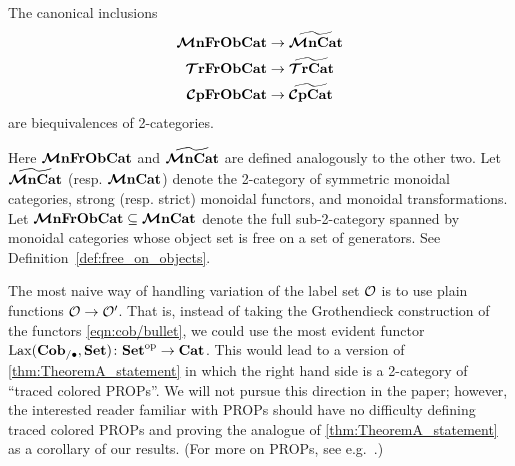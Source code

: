\documentclass[11pt,oneside,article]{memoir}
\begin{document}
\begin{corollary*}[\ref{cor:object_frees}]
   The canonical inclusions
   \begin{align*}
      \bm{\mathcal{M}}\mathbf{nFrObCat} &\to \widetilde{\bm{\mathcal{M}}\mathbf{nCat}} \\
      \bm{\mathcal{T}}\mathbf{rFrObCat} &\to \widetilde{\bm{\mathcal{T}}\mathbf{rCat}} \\
      \bm{\mathcal{C}}\mathbf{pFrObCat} &\to \widetilde{\bm{\mathcal{C}}\mathbf{pCat}}
   \end{align*}
   are biequivalences of 2-categories.
\end{corollary*}
%

Here $\bm{\mathcal{M}}\mathbf{nFrObCat}$ and $\widetilde{\bm{\mathcal{M}}\mathbf{nCat}}$ are defined analogously to the other two. Let $\widetilde{\bm{\mathcal{M}}\mathbf{nCat}}$ (resp. $\bm{\mathcal{M}}\mathbf{nCat}$) denote the 2-category of symmetric monoidal categories, strong (resp. strict) monoidal functors, and monoidal transformations. Let $\bm{\mathcal{M}}\mathbf{nFrObCat}\subseteq\bm{\mathcal{M}}\mathbf{nCat}$ denote the full sub-2-category spanned by monoidal categories whose object set is free on a set of generators. See Definition~\ref{def:free_on_objects}.

\begin{remark}
   The most naive way of handling variation of the label set $\mathcal{O}$ is to use plain functions
   $\mathcal{O}\to\mathcal{O}'$. That is, instead of taking the Grothendieck construction of the functors
   \eqref{eqn:cob/bullet}, we could use the most evident functor
   $\operatorname{Lax}(\mathbf{Cob}_{/\bullet},\mathbf{Set})\colon{\mathbf{Set}}^{\text{op}}\to\mathbf{Cat}$. This would lead to a version of
   \ref{thm:TheoremA_statement} in which the right hand side is a 2-category of ``traced colored
   PROPs''. We will not pursue this direction in the paper; however, the interested reader familiar
   with PROPs should have no difficulty defining traced colored PROPs and proving the analogue of
   \ref{thm:TheoremA_statement} as a corollary of our results. (For more on PROPs, see
   e.g.~\cite{HackneyRobertson}.)
\end{remark}
\end{document}
